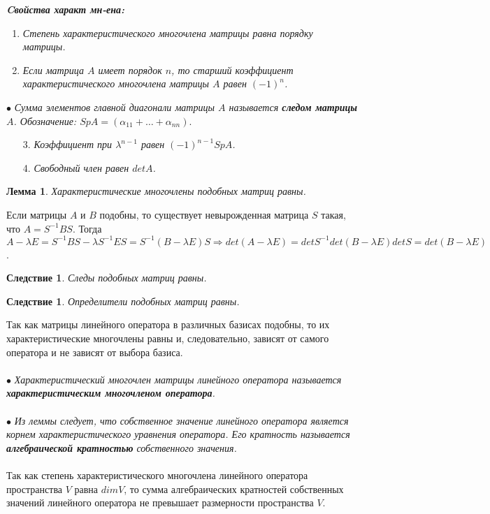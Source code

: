 \textbf{\textit{Cвойства характ мн-ена:}}\begin{enumerate}
	\item \textit{Степень характеристического многочлена матрицы равна порядку матрицы.}
	\item \textit{Если матрица $A$ имеет порядок $n$, то старший коэффициент характеристического многочлена матрицы $A$ равен $(-1)^n$.}
\end{enumerate}
$\bullet$ \textit{Сумма элементов главной диагонали матрицы $A$ называется \textbf{следом матрицы} $A$. Обозначение: $SpA = (\alpha_{11} + \ldots + \alpha_{nn})$}.
\begin{enumerate}
	\item[3.] \textit{Коэффициент при $\lambda^{n-1}$ равен $(-1)^{n-1}SpA$.}
	\item[4.] \textit{Свободный член равен $detA$.}
\end{enumerate}
\newtheorem*{lem11_8_1}{Лемма}\begin{lem11_8_1}Характеристические многочлены подобных матриц равны.
\end{lem11_8_1}\begin{Proof}
	Если матрицы $A$ и $B$ подобны, то существует невырожденная матрица $S$ такая, что $A = S^{-1}BS$. Тогда $A-\lambda E = S^{-1}BS - \lambda S^{-1}ES = S^{-1}(B-\lambda E) S \Rightarrow det(A-\lambda E) = det S^{-1} det(B-\lambda E) det S = det(B-\lambda E)$.
\end{Proof}
\newtheorem*{cor11_8_1}{Следствие}\begin{cor11_8_1}Следы подобных матриц равны.
\end{cor11_8_1}
\newtheorem*{cor11_8_2}{Следствие}\begin{cor11_8_2}Определители подобных матриц равны.
\end{cor11_8_2}
Так как матрицы линейного оператора в различных базисах подобны, то их характеристические многочлены равны и, следовательно, зависят от самого оператора и не зависят от выбора базиса.\\\\
$\bullet$ \textit{Характеристический многочлен матрицы линейного оператора называется \textbf{характеристическим многочленом оператора}.}\\\\
$\bullet$ \textit{Из леммы следует, что собственное значение линейного оператора является корнем характеристического уравнения оператора. Его кратность называется \textbf{алгебраической кратностью} собственного значения.}\\\\
Так как степень характеристического многочлена линейного оператора пространства $V$ равна $dimV$, то сумма алгебраических кратностей собственных значений линейного оператора не превышает размерности пространства $V$.






